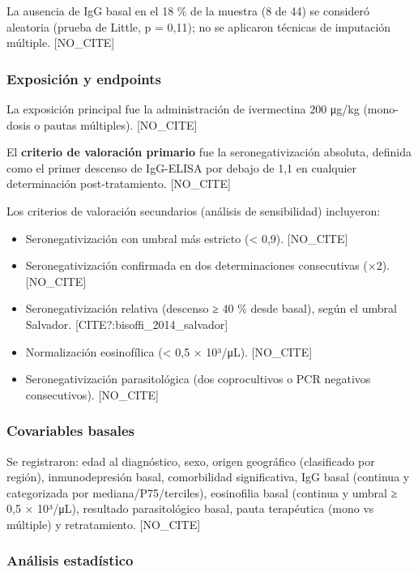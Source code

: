 \documentclass[
  spanish,
  12pt,
  a4paper,
]{article}
\providecommand{\tightlist}{%
  \setlength{\itemsep}{0pt}\setlength{\parskip}{0pt}}
\begin{document}
La ausencia de IgG basal en el 18 \% de la muestra (8 de 44) se
consideró aleatoria (prueba de Little, p = 0,11); no se aplicaron
técnicas de imputación múltiple. {[}NO\_CITE{]}

\subsubsection{Exposición y endpoints}\label{exposiciuxf3n-y-endpoints}

La exposición principal fue la administración de ivermectina 200 μg/kg
(mono-dosis o pautas múltiples). {[}NO\_CITE{]}

El \textbf{criterio de valoración primario} fue la seronegativización
absoluta, definida como el primer descenso de IgG-ELISA por debajo de
1,1 en cualquier determinación post-tratamiento. {[}NO\_CITE{]}

Los criterios de valoración secundarios (análisis de sensibilidad)
incluyeron:

\begin{itemize}
\tightlist
\item
  Seronegativización con umbral más estricto (\textless{} 0,9).
  {[}NO\_CITE{]}
\item
  Seronegativización confirmada en dos determinaciones consecutivas
  (×2). {[}NO\_CITE{]}
\item
  Seronegativización relativa (descenso ≥ 40 \% desde basal), según el
  umbral Salvador. {[}CITE?:bisoffi\_2014\_salvador{]}
\item
  Normalización eosinofílica (\textless{} 0,5 × 10³/μL). {[}NO\_CITE{]}
\item
  Seronegativización parasitológica (dos coprocultivos o PCR negativos
  consecutivos). {[}NO\_CITE{]}
\end{itemize}

\subsubsection{Covariables basales}\label{covariables-basales}

Se registraron: edad al diagnóstico, sexo, origen geográfico
(clasificado por región), inmunodepresión basal, comorbilidad
significativa, IgG basal (continua y categorizada por
mediana/P75/terciles), eosinofilia basal (continua y umbral ≥ 0,5 ×
10³/μL), resultado parasitológico basal, pauta terapéutica (mono vs
múltiple) y retratamiento. {[}NO\_CITE{]}

\subsubsection{Análisis estadístico}\label{anuxe1lisis-estaduxedstico}
\end{document}
